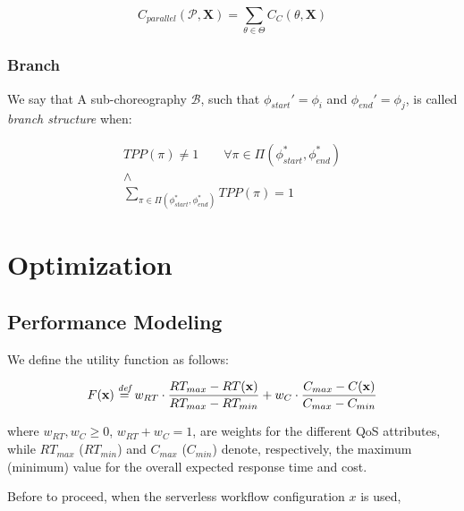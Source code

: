 \begin{equation}
	C_{parallel}(\mathcal{P}, \textbf{X}) = \sum_{\theta \in \Theta} C_C(\theta, \textbf{X})
\end{equation}

\subsubsection{Branch}

We say that A sub-choreography $\mathcal{B}$, such that $\phi_{start}' = \phi_i$ and $\phi_{end}' = \phi_j$, is called \textit{branch structure} when:

\begin{equation}
	\begin{array}{c}
	TPP(\pi) \neq 1 \qquad \forall \pi \in \Pi(\phi_{start}^*, \phi_{end}^*) \\
	\wedge \\
	\displaystyle\sum_{\pi \in \Pi(\phi_{start}^*, \phi_{end}^*)} TPP(\pi) = 1
	\end{array}
\end{equation}


\section{Optimization}


\subsection{Performance Modeling}






We define the utility function as follows:

\begin{equation}
	F(\textbf{x}) \overset{\textit{def}}{=} w_{RT} \cdot \dfrac{RT_{max} - RT(\textbf{x})}{RT_{max} - RT_{min}} + w_{C} \cdot \dfrac{C_{max} - C(\textbf{x})}{C_{max} - C_{min}}
\end{equation}

where $w_{RT}, w_{C} \geq 0$, $w_{RT} + w_{C} = 1$, are weights for the different QoS attributes, while $RT_{max}$ ($RT_{min}$) and $C_{max}$ ($C_{min}$) denote, respectively, the maximum (minimum) value for the overall expected response time and cost.






Before to proceed, when the serverless workflow configuration $x$ is used,




